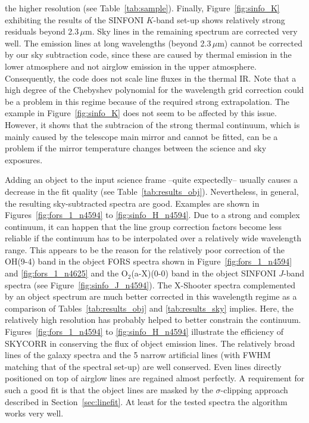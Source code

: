 the higher resolution (see Table~\ref{tab:sample}). Finally,
Figure~\ref{fig:sinfo_K} exhibiting the results of the SINFONI $K$-band set-up
shows relatively strong residuals beyond 2.3\,$\mu$m. Sky lines in the
remaining spectrum are corrected very well. The emission lines at long
wavelengths (beyond 2.3\,$\mu$m) cannot be corrected by our sky subtraction
code, since these are caused by thermal emission in the lower atmosphere and
not airglow emission in the upper atmosphere. Consequently, the code does not
scale line fluxes in the thermal IR. Note that a high degree of the Chebyshev
polynomial for the wavelength grid correction could be a problem in this
regime because of the required strong extrapolation. The example in
Figure~\ref{fig:sinfo_K} does not seem to be affected by this issue. However,
it shows that the subtracion of the strong thermal continuum, which is mainly
caused by the telescope main mirror and cannot be fitted, can be a problem if
the mirror temperature changes between the science and sky exposures.

Adding an object to the input science frame --quite expectedly-- usually causes
a decrease in the fit quality (see Table~\ref{tab:results_obj}). Nevertheless,
in general, the resulting sky-subtracted spectra are good. Examples are shown
in Figures~\ref{fig:fors_1_n4594} to \ref{fig:sinfo_H_n4594}. Due to a strong
and complex continuum, it can happen that the line group correction factors
become less reliable if the continuum has to be interpolated over a relatively
wide wavelength range. This appears to be the reason for the relatively poor
correction of the OH(9-4) band in the object FORS spectra shown in
Figure~\ref{fig:fors_1_n4594} and \ref{fig:fors_1_n4625} and the
O$_2$(a-X)(0-0) band in the object SINFONI $J$-band spectra (see
Figure~\ref{fig:sinfo_J_n4594}). The X-Shooter spectra complemented by an
object spectrum are much better corrected in this wavelength regime as a
comparison of Tables~\ref{tab:results_obj} and \ref{tab:results_sky} implies.
Here, the relatively high resolution has probably helped to better constrain
the continuum. Figures~\ref{fig:fors_1_n4594} to \ref{fig:sinfo_H_n4594}
illustrate the efficiency of SKYCORR in conserving the flux of object emission
lines. The relatively broad lines of the galaxy spectra and the 5 narrow
artificial lines (with FWHM matching that of the spectral set-up) are well
conserved. Even lines directly positioned on top of airglow lines are regained
almost perfectly. A requirement for such a good fit is that the object lines
are masked by the $\sigma$-clipping approach described in
Section~\ref{sec:linefit}. At least for the tested spectra the algorithm works
very well.

